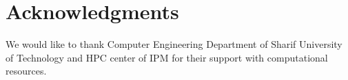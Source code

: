 \documentclass[runningheads]{llncs}
\begin{document}

\section{Acknowledgments}
We would like to thank Computer Engineering Department of Sharif University of Technology and HPC center of IPM for their support with computational resources.






\end{document}
